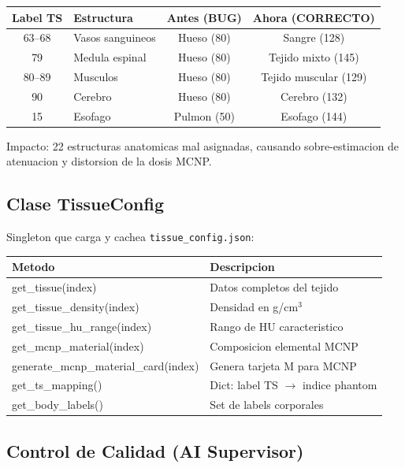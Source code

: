 \documentclass[12pt,a4paper]{article}
\begin{document}
\begin{table}[H]
\centering
\begin{tabular}{c l c c}
\toprule
\textbf{Label TS} & \textbf{Estructura} & \textbf{Antes (BUG)} & \textbf{Ahora (CORRECTO)} \\
\midrule
63--68 & Vasos sanguineos & Hueso (80) & Sangre (128) \\
79 & Medula espinal & Hueso (80) & Tejido mixto (145) \\
80--89 & Musculos & Hueso (80) & Tejido muscular (129) \\
90 & Cerebro & Hueso (80) & Cerebro (132) \\
15 & Esofago & Pulmon (50) & Esofago (144) \\
\bottomrule
\end{tabular}
\end{table}

Impacto: 22 estructuras anatomicas mal asignadas, causando sobre-estimacion de atenuacion y
distorsion de la dosis MCNP.

\subsection{Clase TissueConfig}

Singleton que carga y cachea \texttt{tissue\_config.json}:

\begin{table}[H]
\centering
\begin{tabular}{l l}
\toprule
\textbf{Metodo} & \textbf{Descripcion} \\
\midrule
get\_tissue(index) & Datos completos del tejido \\
get\_tissue\_density(index) & Densidad en g/cm$^3$ \\
get\_tissue\_hu\_range(index) & Rango de HU caracteristico \\
get\_mcnp\_material(index) & Composicion elemental MCNP \\
generate\_mcnp\_material\_card(index) & Genera tarjeta M para MCNP \\
get\_ts\_mapping() & Dict: label TS $\to$ indice phantom \\
get\_body\_labels() & Set de labels corporales \\
\bottomrule
\end{tabular}
\end{table}

\subsection{Control de Calidad (AI Supervisor)}
\end{document}
